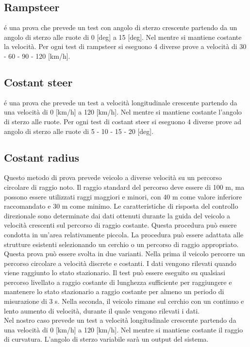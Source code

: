 \subsection{Rampsteer}
é una prova che prevede un test con angolo di sterzo crescente partendo da un angolo di sterzo alle ruote di 0 [deg] a 15 [deg].
Nel mentre si mantiene costante la velocità.
Per ogni test di rampsteer si eseguono 4 diverse prove a velocità di 30 - 60 - 90 - 120 [km/h].

\subsection{Costant steer}
é una prova che prevede un test a velocità longitudinale crescente partendo da una velocità di 0 [km/h] a 120 [km/h].
Nel mentre si mantiene costante l'angolo di sterzo alle ruote.
Per ogni test di costant steer si eseguono 4 diverse prove ad angolo di sterzo alle ruote di 5 - 10 - 15 - 20 [deg].

\subsection{Costant radius}
Questo metodo di prova prevede  veicolo a diverse velocità su un percorso circolare di raggio noto. Il raggio standard del percorso deve essere di 100 m, ma possono essere utilizzati raggi maggiori e minori, con 40 m come valore inferiore raccomandato e 30 m come minimo.
Le caratteristiche di risposta del controllo direzionale sono determinate dai dati ottenuti durante la guida del veicolo a velocità crescenti sul percorso di raggio costante. Questa procedura può essere condotta in un'area relativamente piccola. La procedura può essere adattata alle strutture esistenti selezionando un cerchio o un percorso di raggio appropriato.
\\Questa prova può essere svolta in due varianti. Nella prima il veicolo percorre un percorso circolare a velocità discrete e costanti. I dati vengono rilevati quando viene raggiunto lo stato stazionario. Il test può essere eseguito su qualsiasi percorso livellato a raggio costante di lunghezza sufficiente per raggiungere e mantenere lo stato stazionario a raggio costante per almeno un periodo di misurazione di 3 s. Nella seconda, il veicolo rimane sul cerchio con un continuo e lento aumento di velocità, durante il quale vengono rilevati i dati.
\\Nel nostro caso prevede un test a velocità longitudinale crescente partendo da una velocità di 0 [km/h] a 120 [km/h].
Nel mentre si mantiene costante il raggio di curvatura.
L'angolo di sterzo variabile sarà un output del sistema.

